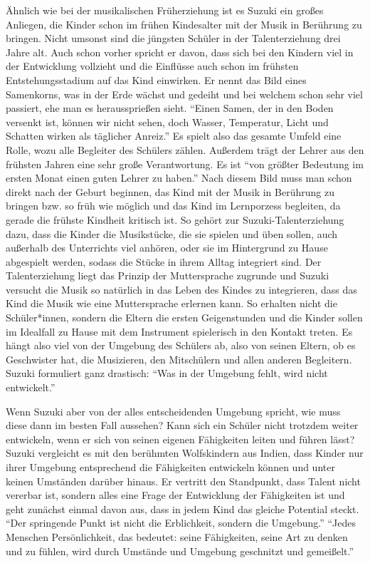 Ähnlich wie bei der musikalischen Früherziehung ist es Suzuki ein großes
Anliegen, die Kinder schon im frühen Kindesalter mit der Musik in Berührung zu
bringen. Nicht umsonst sind die jüngsten Schüler in der Talenterziehung drei
Jahre alt. Auch schon vorher spricht er davon, dass sich bei den Kindern viel in
der Entwicklung vollzieht und die Einflüsse auch schon im frühsten
Entstehungsstadium auf das Kind einwirken. Er nennt das Bild eines Samenkorns,
was in der Erde wächst und gedeiht und bei welchem schon sehr viel passiert, ehe
man es heraussprießen sieht. \enquote{Einen Samen, der in den Boden versenkt ist, können
wir nicht sehen, doch Wasser, Temperatur, Licht und Schatten wirken als
täglicher Anreiz.}\autocite[17]{suzuki:erziehung_ist_liebe} Es spielt also das
gesamte Umfeld eine Rolle, wozu alle Begleiter des Schülers zählen. Außerdem
trägt der Lehrer aus den frühsten Jahren eine sehr große Verantwortung. Es ist
\enquote{von größter Bedeutung im ersten Monat einen guten Lehrer zu haben.}
\autocite[21]{suzuki:erziehung_ist_liebe} Nach diesem Bild muss man schon direkt
nach der Geburt beginnen, das Kind mit der Musik in Berührung zu bringen bzw. so
früh wie möglich und das Kind im Lernporzess begleiten, da gerade die frühste
Kindheit kritisch ist. \autocite[25]{suzuki:erziehung_ist_liebe} So gehört zur
Suzuki-Talenterziehung dazu, dass die Kinder die Musikstücke, die sie spielen
und üben sollen, auch außerhalb des Unterrichts viel anhören, oder sie im
Hintergrund zu Hause abgespielt werden, sodass die Stücke in ihrem Alltag
integriert sind. Der Talenterziehung liegt das Prinzip der Muttersprache
zugrunde und Suzuki versucht die Musik so natürlich in das Leben des Kindes zu
integrieren, dass das Kind die Musik wie eine Muttersprache erlernen kann.  So
erhalten nicht die Schüler*innen, sondern die Eltern die ersten Geigenstunden und die
Kinder sollen im Idealfall zu Hause mit dem Instrument spielerisch
in den Kontakt treten. \autocite[75]{suzuki:erziehung_ist_liebe} Es hängt also
viel von der Umgebung des Schülers ab, also von seinen Eltern, ob es Geschwister
hat, die Musizieren, den Mitschülern und allen anderen Begleitern. Suzuki
formuliert ganz drastisch: \enquote{Was in der Umgebung fehlt, wird nicht entwickelt.}
\autocite[25]{suzuki:erziehung_ist_liebe}

Wenn Suzuki aber von der alles entscheidenden Umgebung spricht, wie muss diese
dann im besten Fall aussehen? Kann sich ein Schüler nicht trotzdem weiter
entwickeln, wenn er sich von seinen eigenen Fähigkeiten leiten und führen lässt?
Suzuki vergleicht es mit den berühmten Wolfskindern aus Indien, dass Kinder nur
ihrer Umgebung entsprechend die Fähigkeiten entwickeln können und unter keinen
Umständen darüber hinaus. \autocite[24]{suzuki:erziehung_ist_liebe} Er vertritt
den Standpunkt, dass Talent nicht vererbar ist, sondern alles eine Frage der
Entwicklung der Fähigkeiten ist und geht zunächst einmal davon aus, dass in
jedem Kind das gleiche Potential steckt. \enquote{Der springende Punkt ist nicht die
Erblichkeit, sondern die Umgebung.} \autocite[24]{suzuki:erziehung_ist_liebe}
\enquote{Jedes Menschen Persönlichkeit, das bedeutet: seine Fähigkeiten, seine Art zu
denken und zu fühlen, wird durch Umstände und Umgebung geschnitzt und
gemeißelt.} \autocite[20]{suzuki:erziehung_ist_liebe}

